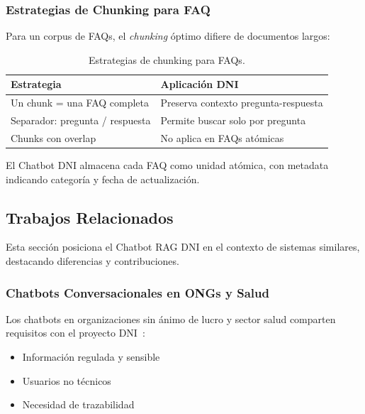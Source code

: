 \subsubsection{Estrategias de Chunking para FAQ}
\label{subsubsec:chunking-faq}

Para un corpus de FAQs, el \textit{chunking} \'optimo difiere de documentos largos:

\begin{table}[H]
\centering
\caption{Estrategias de chunking para FAQs.}
\label{tab:chunking-faq}
\begin{tabular}{@{}ll@{}}
\toprule
\textbf{Estrategia} & \textbf{Aplicaci\'on DNI} \\
\midrule
Un chunk = una FAQ completa & Preserva contexto pregunta-respuesta \\
Separador: pregunta / respuesta & Permite buscar solo por pregunta \\
Chunks con overlap & No aplica en FAQs at\'omicas \\
\bottomrule
\end{tabular}
\end{table}

El Chatbot DNI almacena cada FAQ como unidad at\'omica, con metadata indicando categor\'ia y fecha de actualizaci\'on.

\subsection{Trabajos Relacionados}
\label{subsec:trabajos-relacionados}

Esta secci\'on posiciona el Chatbot RAG DNI en el contexto de sistemas similares, destacando diferencias y contribuciones.

\subsubsection{Chatbots Conversacionales en ONGs y Salud}
\label{subsubsec:chatbots-ongs}

Los chatbots en organizaciones sin \'animo de lucro y sector salud comparten requisitos con el proyecto DNI~\cite{adamopoulou2020chatbots,montenegro2019survey}:
\begin{itemize}
    \item Informaci\'on regulada y sensible
    \item Usuarios no t\'ecnicos
    \item Necesidad de trazabilidad
\end{itemize}

